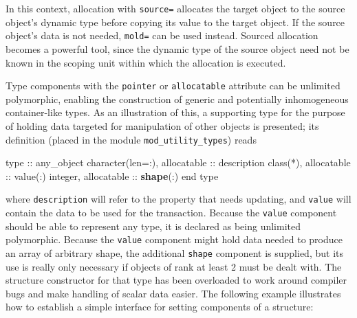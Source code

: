 \documentclass[
  paper=a4,
  ,captions=tableheading
]{scrartcl}
\newenvironment{Shaded}{\begin{snugshade}}{\end{snugshade}}
\newcommand{\DataTypeTok}[1]{\textcolor[rgb]{0.13,0.29,0.53}{#1}}
\newcommand{\FunctionTok}[1]{\textcolor[rgb]{0.13,0.29,0.53}{\textbf{#1}}}
\newcommand{\NormalTok}[1]{#1}
\begin{document}
In this context, allocation with \texttt{source=} allocates the target
object to the source object's dynamic type before copying its value to
the target object. If the source object's data is not needed,
\texttt{mold=} can be used instead. Sourced allocation becomes a
powerful tool, since the dynamic type of the source object need not be
known in the scoping unit within which the allocation is executed.

Type components with the \texttt{pointer} or \texttt{allocatable}
attribute can be unlimited polymorphic, enabling the construction of
generic and potentially inhomogeneous container-like types. As an
illustration of this, a supporting type for the purpose of holding data
targeted for manipulation of other objects is presented; its definition
(placed in the module \texttt{mod\_utility\_types}) reads

\begin{Shaded}
\begin{Highlighting}[]
\DataTypeTok{type} \DataTypeTok{::}\NormalTok{ any\_object}
  \DataTypeTok{character(len=:)}\NormalTok{, }\DataTypeTok{allocatable} \DataTypeTok{::}\NormalTok{ description}
  \DataTypeTok{class(*)}\NormalTok{, }\DataTypeTok{allocatable} \DataTypeTok{::} \DataTypeTok{value}\NormalTok{(:)}
  \DataTypeTok{integer}\NormalTok{, }\DataTypeTok{allocatable} \DataTypeTok{::} \FunctionTok{shape}\NormalTok{(:)}
\DataTypeTok{end type}
\end{Highlighting}
\end{Shaded}

where \texttt{description} will refer to the property that needs
updating, and \texttt{value} will contain the data to be used for the
transaction. Because the \texttt{value} component should be able to
represent any type, it is declared as being unlimited polymorphic.
Because the \texttt{value} component might hold data needed to produce
an array of arbitrary shape, the additional \texttt{shape} component is
supplied, but its use is really only necessary if objects of rank at
least 2 must be dealt with. The structure constructor for that type has
been overloaded to work around compiler bugs and make handling of scalar
data easier. The following example illustrates how to establish a simple
interface for setting components of a structure:
\end{document}
